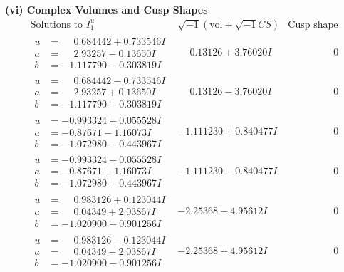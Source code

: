 \documentclass[1p]{elsarticle_modified}
\theoremstyle{definition}
\newcommand{\I}{\sqrt{-1}}
\begin{document}
\newpage\flushleft \textbf{(vi) Complex Volumes and Cusp Shapes}
$$\begin{array}{c|c|c}  
\text{Solutions to }I^u_{1}& \I (\text{vol} + \sqrt{-1}CS) & \text{Cusp shape}\\
 \hline 
\begin{aligned}
u &= \phantom{-}0.684442 + 0.733546 I \\
a &= \phantom{-}2.93257 - 0.13650 I \\
b &= -1.117790 - 0.303819 I\end{aligned}
 & \phantom{-}0.13126 + 3.76020 I & \phantom{-0.000000 } 0 \\ \hline\begin{aligned}
u &= \phantom{-}0.684442 - 0.733546 I \\
a &= \phantom{-}2.93257 + 0.13650 I \\
b &= -1.117790 + 0.303819 I\end{aligned}
 & \phantom{-}0.13126 - 3.76020 I & \phantom{-0.000000 } 0 \\ \hline\begin{aligned}
u &= -0.993324 + 0.055528 I \\
a &= -0.87671 - 1.16073 I \\
b &= -1.072980 - 0.443967 I\end{aligned}
 & -1.111230 + 0.840477 I & \phantom{-0.000000 } 0 \\ \hline\begin{aligned}
u &= -0.993324 - 0.055528 I \\
a &= -0.87671 + 1.16073 I \\
b &= -1.072980 + 0.443967 I\end{aligned}
 & -1.111230 - 0.840477 I & \phantom{-0.000000 } 0 \\ \hline\begin{aligned}
u &= \phantom{-}0.983126 + 0.123044 I \\
a &= \phantom{-}0.04349 + 2.03867 I \\
b &= -1.020900 + 0.901256 I\end{aligned}
 & -2.25368 - 4.95612 I & \phantom{-0.000000 } 0 \\ \hline\begin{aligned}
u &= \phantom{-}0.983126 - 0.123044 I \\
a &= \phantom{-}0.04349 - 2.03867 I \\
b &= -1.020900 - 0.901256 I\end{aligned}
 & -2.25368 + 4.95612 I & \phantom{-0.000000 } 0 \\ \hline\begin{aligned}

\end{aligned}
\end{array}$$
\end{document}
